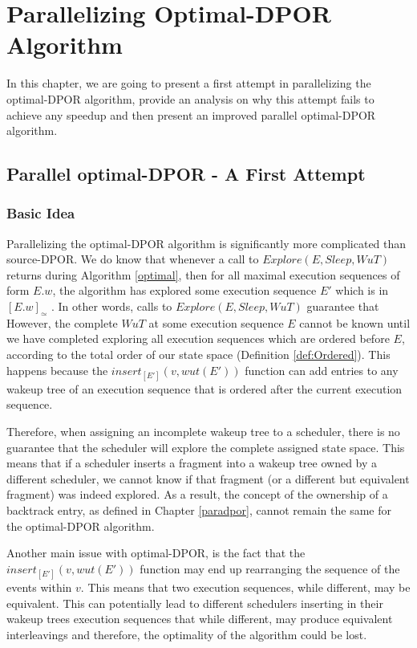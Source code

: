 \chapter{Parallelizing Optimal-DPOR Algorithm}
\label{paradpor_opt}

In this chapter, we are going to present a first attempt in parallelizing the optimal-DPOR
algorithm, provide an analysis on why this attempt fails to achieve any speedup and then present 
an improved parallel optimal-DPOR algorithm.


\section{Parallel optimal-DPOR - A First Attempt}

\subsection{Basic Idea}

Parallelizing the optimal-DPOR algorithm is significantly more complicated than source-DPOR. We do know that whenever a call to 
$Explore(E, Sleep, WuT)$ returns during Algorithm \ref{optimal}, then for all maximal execution sequences
of form $E.w$, the algorithm has explored some execution sequence $E'$ which is in $[E.w]_\simeq$ \cite{AbdullaAronisJohnssonSagonasDPOR2014}. In other words, calls to $Explore(E, Sleep, WuT)$ guarantee that
However, the complete $WuT$ at some execution sequence $E$ cannot be known until we have completed
exploring all execution sequences which are ordered before $E$, according to the total order of our state space
(Definition \ref{def:Ordered}). This happens because the $insert_{[E']}(v,wut(E'))$ function can add
entries to any wakeup tree of an execution sequence that is ordered after the current execution sequence.

Therefore, when assigning an incomplete wakeup tree to a scheduler, there is no
guarantee that the scheduler will explore the complete assigned state space. This means that if a
scheduler inserts a fragment into a wakeup tree owned by a different scheduler, we cannot know if that 
fragment (or a different but equivalent fragment) was indeed explored. As a result, the concept of the ownership of a 
backtrack entry, as defined in Chapter \ref{paradpor}, cannot remain the same for the optimal-DPOR algorithm.

Another main issue with optimal-DPOR, is the fact that the $insert_{[E']}(v,wut(E'))$ function may end up
rearranging the sequence of the events within $v$. This means that two execution sequences, while different,
may be equivalent. This can potentially lead to different schedulers inserting in their
wakeup trees execution sequences that while different, may produce equivalent interleavings and therefore, the optimality
of the algorithm could be lost.

